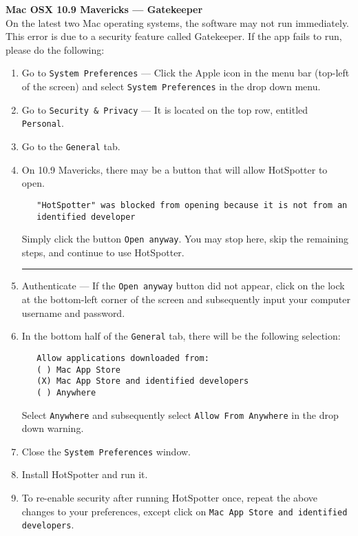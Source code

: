 
\newcommand{\HRuled}{\rule{\linewidth}{0.1mm}}

    \textbf{Mac OSX 10.9 Mavericks --- Gatekeeper}\\
      On the latest two Mac operating systems, the software may not run immediately. 
      This error is due to a security feature called Gatekeeper.  If the app
      fails to run, please do the following:
        \begin{enumerate}
            \item Go to {\tt System Preferences} --- Click the Apple icon in the menu bar (top-left of the screen) and select {\tt System Preferences} in the drop down menu.
            \item Go to {\tt Security \& Privacy} --- It is located on the top row, entitled {\tt Personal}.
            \item Go to the {\tt General} tab.
	  \item On 10.9 Mavericks, there may be a button that will allow HotSpotter to open.  
	\begin{Verbatim}
   "HotSpotter" was blocked from opening because it is not from an 
   identified developer
          \end{Verbatim}

	Simply click the button {\tt Open anyway}.  You may stop here, skip the remaining steps, and continue to use HotSpotter. 

           \HRuled

	\item Authenticate --- If the {\tt Open anyway} button did not appear, click on the lock at the bottom-left corner of the screen and subsequently input your computer username and password.
            \item In the bottom half of the {\tt General} tab, there will be the following selection:
                \begin{Verbatim}
   Allow applications downloaded from:
   ( ) Mac App Store
   (X) Mac App Store and identified developers
   ( ) Anywhere
                \end{Verbatim}

                Select {\tt Anywhere} and subsequently select {\tt Allow From Anywhere} in the drop down warning.

            \item Close the {\tt System Preferences} window.
            \item Install HotSpotter and run it.
            \item To re-enable security after running HotSpotter once,
                repeat the above changes to your preferences, except click on
                \texttt{Mac App Store and identified developers}.
	\end{enumerate}
